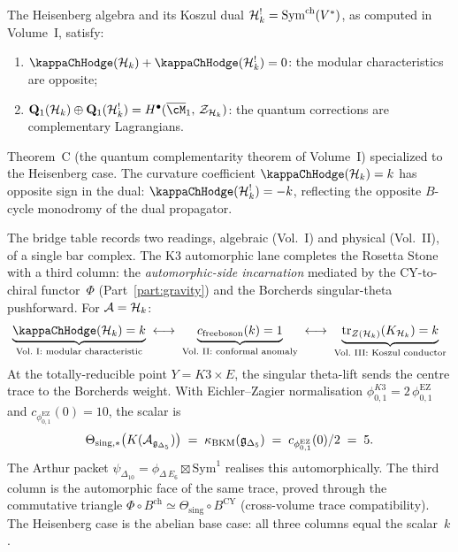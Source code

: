 \begin{proposition}
\label{prop:rosetta-complementarity}
The Heisenberg algebra and its Koszul dual
$\mathcal{H}_k^! = \mathrm{Sym}^{\mathrm{ch}}(V^*)$,
as computed in Volume~I,
satisfy:
\begin{enumerate}[label=\textup{(\roman*)}]
\item $\kappaChHodge(\cH_k) + \kappaChHodge(\cH_k^!) = 0$:
 the modular characteristics are opposite;
\item $\mathbf{Q}_1(\cH_k) \oplus \mathbf{Q}_1(\cH_k^!)
 = H^{\bullet}(\overline{\cM}_1,\, \mathcal{Z}_{\cH_k})$:
 the quantum corrections are complementary Lagrangians.
\end{enumerate}
Theorem~C \textup{(}the quantum complementarity theorem of Volume~I\textup{)} specialized to the Heisenberg case. The curvature coefficient $\kappaChHodge(\cH_k) = k$ has opposite sign in the dual: $\kappaChHodge(\cH_k^!) = -k$, reflecting the opposite $B$-cycle monodromy of the dual propagator.
\end{proposition}

\begin{remark}
\label{rem:rosetta-phi-trace-third-column}
%
%
The bridge table records two readings, algebraic (Vol.~I) and physical (Vol.~II), of a single bar complex. The K3 automorphic lane completes the Rosetta Stone with a third column: the \emph{automorphic-side incarnation} mediated by the CY-to-chiral functor~$\Phi$ (Part~\ref{part:gravity}) and the Borcherds singular-theta pushforward. For $\mathcal{A} = \mathcal{H}_k$:
\[
\underbrace{\kappaChHodge(\cH_k) = k}_{\text{Vol.~I: modular characteristic}}
\;\longleftrightarrow\;
\underbrace{c_{\mathrm{free boson}}(k) = 1}_{\text{Vol.~II: conformal anomaly}}
\;\longleftrightarrow\;
\underbrace{\mathrm{tr}_{Z(\cH_k)}(K_{\cH_k}) = k}_{\text{Vol.~III: Koszul conductor}}
\]
At the totally-reducible point $Y = K3 \times E$, the singular theta-lift sends the centre trace to the Borcherds weight. With Eichler--Zagier normalisation $\phi_{0,1}^{K3}=2\,\phi_{0,1}^{\mathrm{EZ}}$ and $c_{\phi_{0,1}^{\mathrm{EZ}}}(0)=10$, the scalar is
\[
\Theta_{\mathrm{sing},\ast}
\bigl(K(\mathcal{A}_{\mathfrak g_{\Delta_5}})\bigr)
\;=\;
\kappa_{\mathrm{BKM}}(\mathfrak g_{\Delta_5})
\;=\;
c_{\phi_{0,1}^{\mathrm{EZ}}}(0)/2
\;=\;
5.
\]
The Arthur packet $\psi_{\Delta_{10}} = \phi_{\Delta\,E_6} \boxtimes \mathrm{Sym}^1$ realises this automorphically. The third column is the automorphic face of the same trace, proved through the commutative triangle $\Phi \circ B^{\mathrm{ch}} \simeq \Theta_{\mathrm{sing}} \circ B^{\mathrm{CY}}$ \textup{(}cross-volume trace compatibility\textup{)}. The Heisenberg case is the abelian base case: all three columns equal the scalar~$k$.
\end{remark}


